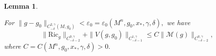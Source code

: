 \documentclass[12pt]{amsart}
\newcommand{\calM}{\mathcal{M}}
\renewcommand{\1}{{\mathbf 1}}
\newcommand{\Ric}{\mathrm{Ric}}
\newcommand{\eps}{{\varepsilon}}
\newtheorem{lemma}[thm]{Lemma}
\theoremstyle{others}
\numberwithin{equation}{section}
\begin{document}
\begin{lemma}\label{lemma:RicandVbounds}

    For $\|g - g_0\|_{C^{2, \gamma}_{-\delta}(M, g_0)} < \eps_0 = \eps_0 (M^n, g_0, x_*, \gamma, \delta),$ we have
    \begin{equation}
        \|\Ric_g \|_{C^{0,\gamma}_{-\delta-2}} + \|V(g,g_0) \|_{C^{1,\gamma}_{-\delta-1}} \leq C \| \calM(g) \|_{C^{0, \gamma}_{-\delta - 2}},
    \end{equation}
    where $C = C(M^n, g_0, x_*, \gamma, \delta) > 0.$


\end{lemma}
\end{document}
